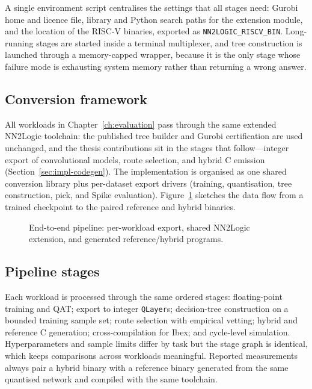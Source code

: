 A single environment script centralises the settings that all stages need: Gurobi home and licence file, library and Python search paths for the extension module, and the location of the \mbox{RISC-V} binaries, exported as \texttt{NN2LOGIC\_RISCV\_BIN}.
Long-running stages are started inside a terminal multiplexer, and tree construction is launched through a memory-capped wrapper, because it is the only stage whose failure mode is exhausting system memory rather than returning a wrong answer.

\subsection{Conversion framework}

All workloads in Chapter~\ref{ch:evaluation} pass through the same extended NN2Logic toolchain: the published tree builder and Gurobi certification are used unchanged, and the thesis contributions sit in the stages that follow---integer export of convolutional models, route selection, and hybrid C emission (Section~\ref{sec:impl-codegen}).
The implementation is organised as one shared conversion library plus per-dataset export drivers (training, quantisation, tree construction, pick, and Spike evaluation).
Figure~\ref{fig:impl-codebase} sketches the data flow from a trained checkpoint to the paired reference and hybrid binaries.

\begin{figure}[H]
	\centering
	\caption{End-to-end pipeline: per-workload export, shared NN2Logic extension, and generated reference/hybrid programs.}
	\label{fig:impl-codebase}
\end{figure}

\subsection{Pipeline stages}

Each workload is processed through the same ordered stages: floating-point training and \ac{QAT}; export to integer \texttt{QLayer}s; decision-tree construction on a bounded training sample set; route selection with empirical vetting; hybrid and reference C generation; cross-compilation for Ibex; and cycle-level simulation.
Hyperparameters and sample limits differ by task but the stage graph is identical, which keeps comparisons across workloads meaningful.
Reported measurements always pair a hybrid binary with a reference binary generated from the same quantised network and compiled with the same toolchain.


